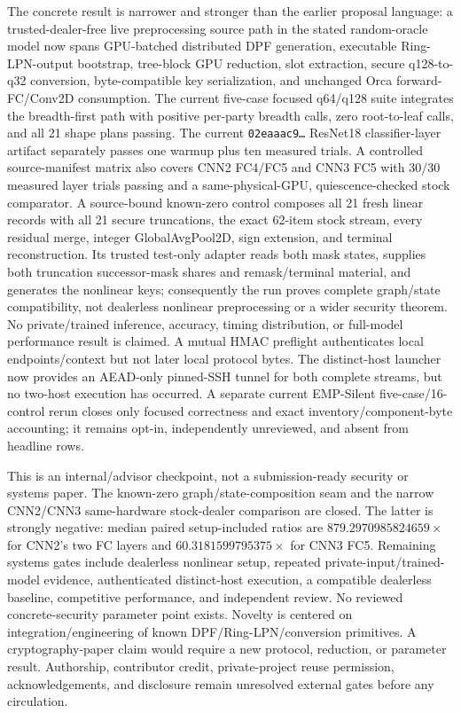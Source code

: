 \documentclass[11pt]{article}
\begin{document}
The concrete result is narrower and stronger than the earlier proposal
language: a trusted-dealer-free live preprocessing source path in the stated
random-oracle model now spans GPU-batched distributed DPF generation,
executable Ring-LPN-output bootstrap, tree-block GPU reduction, slot extraction,
secure q128-to-q32 conversion, byte-compatible key serialization, and unchanged
Orca forward-FC/Conv2D consumption. The current five-case focused q64/q128 suite
integrates the breadth-first path with positive per-party breadth calls, zero
root-to-leaf calls, and all 21 shape plans passing. The current
\texttt{02eaaac9\ldots} ResNet18 classifier-layer artifact separately passes
one warmup plus ten measured trials. A controlled source-manifest matrix also
covers CNN2 FC4/FC5 and CNN3 FC5 with 30/30 measured layer trials passing and a
same-physical-GPU, quiescence-checked stock comparator.
A source-bound known-zero control composes
all 21 fresh linear records with all 21 secure truncations, the exact 62-item
stock stream, every residual merge, integer GlobalAvgPool2D, sign extension,
and terminal reconstruction. Its trusted test-only adapter reads both mask
states, supplies both truncation successor-mask shares and remask/terminal
material, and generates the nonlinear keys; consequently the run proves
complete graph/state compatibility, not dealerless nonlinear preprocessing or
a wider security theorem. No private/trained inference, accuracy, timing
distribution, or full-model performance result is claimed. A mutual HMAC
preflight authenticates local endpoints/context but not later local protocol
bytes. The distinct-host launcher now provides an AEAD-only pinned-SSH tunnel
for both complete streams, but no two-host execution has occurred. A separate
current EMP-Silent five-case/16-control rerun closes only focused correctness
and exact inventory/component-byte accounting; it remains opt-in,
independently unreviewed, and absent from headline rows.

This is an internal/advisor checkpoint, not a submission-ready security or
systems paper. The known-zero graph/state-composition seam and the narrow
CNN2/CNN3 same-hardware stock-dealer comparison are closed. The latter is
strongly negative: median paired setup-included ratios are
$879.2970985824659\times$ for CNN2's two FC layers and
$60.3181599795375\times$ for CNN3 FC5. Remaining systems gates include
dealerless nonlinear setup, repeated private-input/trained-model evidence,
authenticated distinct-host execution, a compatible dealerless baseline,
competitive performance, and independent review. No reviewed
concrete-security parameter point exists. Novelty is centered on
integration/engineering of known DPF/Ring-LPN/conversion
primitives. A cryptography-paper claim would require a new protocol, reduction,
or parameter result. Authorship, contributor credit, private-project reuse
permission, acknowledgements, and disclosure remain unresolved external gates
before any circulation.
\end{document}
